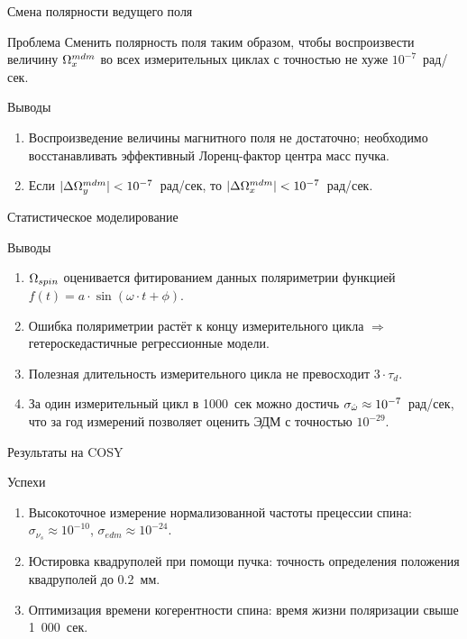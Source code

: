\documentclass[14pt]{beamer}
\newcommand{\Wmdm}{\W^{mdm}}
\begin{document}
\begin{frame}{Смена полярности ведущего поля}
	\begin{block}{Проблема}
		Сменить полярность поля таким образом, чтобы воспроизвести величину $\Wmdm_x$ во всех измерительных циклах с точностью не хуже $10^{-7}$~рад/сек.
	\end{block}
	\begin{block}{Выводы}
		\begin{enumerate}
			\item Воспроизведение величины магнитного поля не достаточно; необходимо восстанавливать эффективный Лоренц-фактор центра масс пучка.
			\item Если $|\Delta\Wmdm_y| < 10^{-7}$~рад/сек, то $|\Delta\Wmdm_x|<10^{-7}$~рад/сек.
		\end{enumerate}
	\end{block}
\end{frame}

\begin{frame}{Статистическое моделирование}
	\begin{block}{Выводы}
		\begin{enumerate}
			\item $\Omega_{spin}$ оценивается фитированием данных поляриметрии функцией $f(t)=a\cdot \sin(\omega\cdot t + \phi)$.
			\item Ошибка поляриметрии растёт к концу измерительного цикла $\Rightarrow$ гетероскедастичные регрессионные модели.
			\item Полезная длительность измерительного цикла не превосходит $3\cdot\tau_d$.
			\item За один измерительный цикл в 1000~сек можно достичь $\sigma_{\hat{\omega}}\approx 10^{-7}$~рад/сек, что за год измерений позволяет оценить ЭДМ с точностью $10^{-29}$\ecm.
		\end{enumerate}
	\end{block}
\end{frame}
\begin{frame}{Результаты на COSY}
	\begin{block}{Успехи}
		\begin{enumerate}
			\item Высокоточное измерение нормализованной частоты прецессии спина: $\sigma_{\nu_s}\approx 10^{-10}$, $\sigma_{edm}\approx 10^{-24}$\ecm.
			\item Юстировка квадруполей при помощи пучка: точность определения положения квадруполей до 0.2~мм.
			\item Оптимизация времени когерентности спина: время жизни поляризации свыше 1~000~сек.
		\end{enumerate}
	\end{block}
\end{frame}
\end{document}

